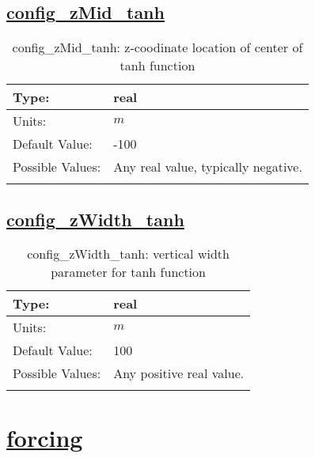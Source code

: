 \subsection[config\_zMid\_tanh]{\hyperref[sec:nm_tab_vmix_tanh]{config\_zMid\_tanh}}
\label{subsec:nm_sec_config_zMid_tanh}
\begin{center}
\begin{longtable}{| p{2.0in} | p{4.0in} |}
    \hline
    Type: & real \\
    \hline
    Units: & $m$ \\
    \hline
    Default Value: & -100 \\
    \hline
    Possible Values: & Any real value, typically negative. \\
    \hline
    \caption{config\_zMid\_tanh: z-coodinate location of center of tanh function}
\end{longtable}
\end{center}
\subsection[config\_zWidth\_tanh]{\hyperref[sec:nm_tab_vmix_tanh]{config\_zWidth\_tanh}}
\label{subsec:nm_sec_config_zWidth_tanh}
\begin{center}
\begin{longtable}{| p{2.0in} | p{4.0in} |}
    \hline
    Type: & real \\
    \hline
    Units: & $m$ \\
    \hline
    Default Value: & 100 \\
    \hline
    Possible Values: & Any positive real value. \\
    \hline
    \caption{config\_zWidth\_tanh: vertical width parameter for tanh function}
\end{longtable}
\end{center}
\section[forcing]{\hyperref[sec:nm_tab_forcing]{forcing}}
\label{sec:nm_sec_forcing}

